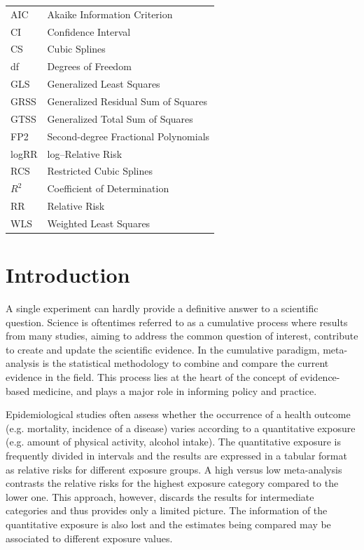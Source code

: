\documentclass[11pt,a4paper,twoside,openany]{book}\usepackage{knitr}
\begin{document}
{\begin{tabular}{ll}
AIC & Akaike Information Criterion \\
CI & Confidence Interval \\
CS & Cubic Splines \\
df & Degrees of Freedom \\
GLS & Generalized Least Squares \\
GRSS & Generalized Residual Sum of Squares \\
GTSS & Generalized Total Sum of Squares \\
FP2 & Second-degree Fractional Polynomials \\
logRR & log--Relative Risk \\
RCS & Restricted Cubic Splines \\
$R^2$ & Coefficient of Determination \\
RR & Relative Risk \\
WLS & Weighted Least Squares


\end{tabular}

\mainmatter
\pagestyle{mainmatter}



%

\chapter{Introduction}

A single experiment can hardly provide a definitive answer to a scientific question. Science is oftentimes referred to as a cumulative process where results from many studies, aiming to address the common question of interest, contribute to create and update the scientific evidence. In the cumulative paradigm, meta-analysis is the statistical methodology to combine and compare the current evidence in the field. This process lies at the heart of the concept of evidence-based medicine, and plays a major role in informing policy and practice.

Epidemiological studies often assess whether the occurrence of a health outcome (e.g. mortality, incidence of a disease) varies according to a quantitative exposure (e.g. amount of physical activity, alcohol intake). 
The quantitative exposure is frequently divided in intervals and the results are expressed in a tabular format as relative risks for different exposure groups. A high versus low meta-analysis contrasts the relative risks for the highest exposure category compared to the lower one. This approach, however, discards the results for intermediate categories and thus provides only a limited picture. The information of the quantitative exposure is also lost and the estimates being compared may be associated to different exposure values.

}
\end{document}
